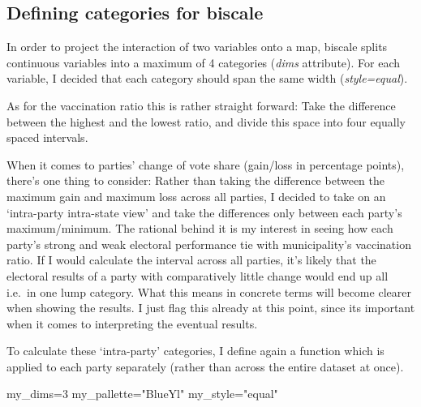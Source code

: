 \documentclass[
  letterpaper,
  DIV=11,
  numbers=noendperiod,
  oneside]{scrartcl}
\newenvironment{Shaded}{\begin{snugshade}}{\end{snugshade}}
\newcommand{\DecValTok}[1]{\textcolor[rgb]{0.68,0.00,0.00}{#1}}
\newcommand{\NormalTok}[1]{\textcolor[rgb]{0.00,0.23,0.31}{#1}}
\newcommand{\OtherTok}[1]{\textcolor[rgb]{0.00,0.23,0.31}{#1}}
\newcommand{\StringTok}[1]{\textcolor[rgb]{0.13,0.47,0.30}{#1}}
\begin{document}
\hypertarget{defining-categories-for-biscale}{%
\subsection{Defining categories for
biscale}\label{defining-categories-for-biscale}}

In order to project the interaction of two variables onto a map, biscale
splits continuous variables into a maximum of 4 categories (\emph{dims}
attribute). For each variable, I decided that each category should span
the same width (\emph{style=equal}).

As for the vaccination ratio this is rather straight forward: Take the
difference between the highest and the lowest ratio, and divide this
space into four equally spaced intervals.

When it comes to parties' change of vote share (gain/loss in percentage
points), there's one thing to consider: Rather than taking the
difference between the maximum gain and maximum loss across all parties,
I decided to take on an `intra-party intra-state view' and take the
differences only between each party's maximum/minimum. The rational
behind it is my interest in seeing how each party's strong and weak
electoral performance tie with municipality's vaccination ratio. If I
would calculate the interval across all parties, it's likely that the
electoral results of a party with comparatively little change would end
up all i.e.~in one lump category. What this means in concrete terms will
become clearer when showing the results. I just flag this already at
this point, since its important when it comes to interpreting the
eventual results.

To calculate these `intra-party' categories, I define again a function
which is applied to each party separately (rather than across the entire
dataset at once).

\begin{Shaded}
\begin{Highlighting}[]
\NormalTok{my\_dims}\OtherTok{=}\DecValTok{3}
\NormalTok{my\_pallette}\OtherTok{=}\StringTok{"BlueYl"}
\NormalTok{my\_style}\OtherTok{=}\StringTok{"equal"}
\end{Highlighting}
\end{Shaded}
\end{document}
